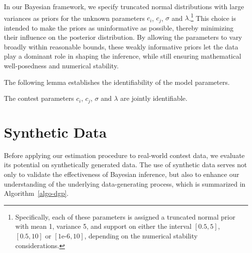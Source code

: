 \documentclass[mnsc]{informs3}
\begin{document}
In our Bayesian framework, we specify truncated normal distributions with large variances as priors for the unknown parameters $c_i$, $c_j$, $\sigma$ and $\lambda$.\footnote{Specifically, each of these parameters is assigned a truncated normal prior with mean 1, variance 5, and support on either the interval $[0.5, 5]$, $[0.5, 10]$ or $[\text{1e-6}, 10]$, depending on the numerical stability considerations.}
This choice is intended to make the priors as uninformative as possible, thereby minimizing their influence on the posterior distribution. 
By allowing the parameters to vary broadly within reasonable bounds, these weakly informative priors let the data play a dominant role in shaping the inference, while still ensuring mathematical well-posedness and numerical stability.

The following lemma establishes the identifiability of the model parameters.

\begin{lemma}\label{lmm-params-identifiability}
The contest parameters $c_i$, $c_j$, $\sigma$ and $\lambda$ are jointly identifiable. 
\end{lemma}







\section{Synthetic Data}

Before applying our estimation procedure to real-world contest data, we evaluate its potential on synthetically generated data. 
The use of synthetic data serves not only to validate the effectiveness of Bayesian inference, but also to enhance our understanding of the underlying data-generating process, which is summarized in Algorithm~\ref{algo-dgp}. 
\end{document}
